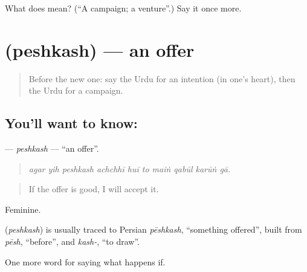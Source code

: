 \begin{tcolorbox}[breakable,colback=teal!4,colframe=teal!35!black,title={Before you move on}]
What does  mean? (\textquotedblleft{}A campaign; a venture\textquotedblright{}.) Say it once more.
\end{tcolorbox}
\section[\texorpdfstring{\ur{پیشکش} (peshkash)}{پیشکش (peshkash)}]{ (peshkash) — an offer}

\label{lesson:UR-C547-peshkash}



\begin{quote}
Before the new one: say the Urdu for an intention (in one's heart), then the Urdu for a campaign.
\end{quote}

\subsection*{You'll want to know: }
\textbf{} — \emph{peshkash} — \textquotedblleft{}an offer\textquotedblright{}.

\begin{quote}
         
\end{quote}

\begin{quote}
\emph{agar yih peshkash achchhī huī to maiṅ qabūl karūṅ gā.}
\end{quote}

\begin{quote}
If the offer is good, I will accept it.
\end{quote}

Feminine.

\begin{cousinweb}
\textbf{} (\emph{peshkash}) is usually traced to Persian \emph{pēshkash}, \textquotedblleft{}something offered\textquotedblright{}, built from \emph{pēsh}, \textquotedblleft{}before\textquotedblright{}, and \emph{kash-}, \textquotedblleft{}to draw\textquotedblright{}.
\end{cousinweb}

\begin{grammarlens}[title={What you've built}]
One more word for saying what happens if.
\end{grammarlens}

